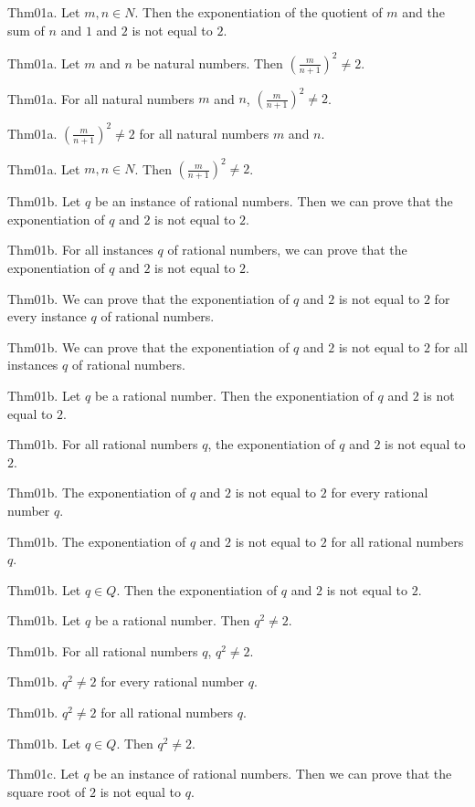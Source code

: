 \documentclass{article}
\begin{document}
Thm01a. Let $m , n \in N$. Then the exponentiation of the quotient of $m$ and the sum of $n$ and $1$ and $2$ is not equal to $2$.

Thm01a. Let $m$ and $n$ be natural numbers. Then $(\frac{ m}{n + 1})^ {2}\neq 2$.

Thm01a. For all natural numbers $m$ and $n$, $(\frac{ m}{n + 1})^ {2}\neq 2$.

Thm01a. $(\frac{ m}{n + 1})^ {2}\neq 2$ for all natural numbers $m$ and $n$.

Thm01a. Let $m , n \in N$. Then $(\frac{ m}{n + 1})^ {2}\neq 2$.

Thm01b. Let $q$ be an instance of rational numbers. Then we can prove that the exponentiation of $q$ and $2$ is not equal to $2$.

Thm01b. For all instances $q$ of rational numbers, we can prove that the exponentiation of $q$ and $2$ is not equal to $2$.

Thm01b. We can prove that the exponentiation of $q$ and $2$ is not equal to $2$ for every instance $q$ of rational numbers.

Thm01b. We can prove that the exponentiation of $q$ and $2$ is not equal to $2$ for all instances $q$ of rational numbers.

Thm01b. Let $q$ be a rational number. Then the exponentiation of $q$ and $2$ is not equal to $2$.

Thm01b. For all rational numbers $q$, the exponentiation of $q$ and $2$ is not equal to $2$.

Thm01b. The exponentiation of $q$ and $2$ is not equal to $2$ for every rational number $q$.

Thm01b. The exponentiation of $q$ and $2$ is not equal to $2$ for all rational numbers $q$.

Thm01b. Let $q \in Q$. Then the exponentiation of $q$ and $2$ is not equal to $2$.

Thm01b. Let $q$ be a rational number. Then $q ^ {2}\neq 2$.

Thm01b. For all rational numbers $q$, $q ^ {2}\neq 2$.

Thm01b. $q ^ {2}\neq 2$ for every rational number $q$.

Thm01b. $q ^ {2}\neq 2$ for all rational numbers $q$.

Thm01b. Let $q \in Q$. Then $q ^ {2}\neq 2$.

Thm01c. Let $q$ be an instance of rational numbers. Then we can prove that the square root of $2$ is not equal to $q$.
\end{document}
